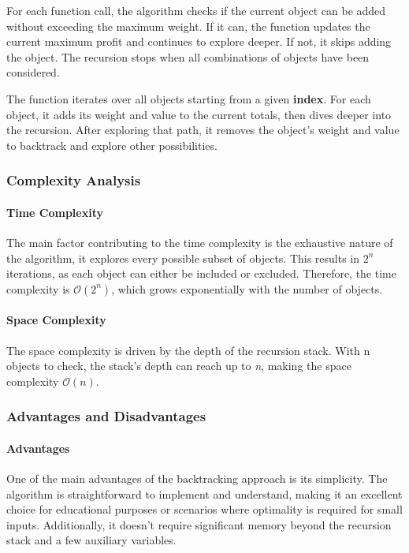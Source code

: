 \documentclass[runningheads]{llncs}
\begin{document}
For each function call, the algorithm checks if the current object can be added without exceeding 
the maximum weight. If it can, the function updates the current maximum profit and continues to 
explore deeper. If not, it skips adding the object. The recursion stops when all combinations of
objects have been considered.

The function iterates over all objects starting from a given \textbf{index}. For each object, it 
adds its weight and value to the current totals, then dives deeper into the recursion. After 
exploring that path, it removes the object's weight and value to backtrack and explore other 
possibilities.

\subsubsection{Complexity Analysis}
\paragraph{Time Complexity}
The main factor contributing to the time complexity is the exhaustive nature of the algorithm, it 
explores every possible subset of objects. This results in \( 2^n \) iterations, as each object can 
either be included or excluded. Therefore, the time complexity is $\mathcal{O}(2^n)$, which grows
exponentially with the number of objects.

\paragraph{Space Complexity}
The space complexity is driven by the depth of the recursion stack. With n objects to check, the 
stack's depth can reach up to \textit{n}, making the space complexity $\mathcal{O}(n)$.

\subsubsection{Advantages and Disadvantages}
\paragraph{Advantages}
One of the main advantages of the backtracking approach is its simplicity. The algorithm is
straightforward to implement and understand, making it an excellent choice for educational purposes
or scenarios where optimality is required for small inputs. Additionally, it doesn't require 
significant memory beyond the recursion stack and a few auxiliary variables.
\end{document}
